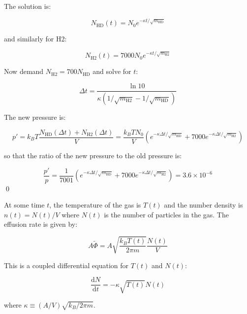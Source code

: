 \documentclass[12pt]{article}
\begin{document}
The solution is:

\begin{equation}
    N_{\text{HD}}(t) = N_{0} e^{-\kappa t/\sqrt{m_{\text{HD}}}}
\end{equation}

and similarly for H2:

\begin{equation}
    N_{\text{H2}}(t) = 7000N_{0} e^{-\kappa t/\sqrt{m_{\text{H2}}}}
\end{equation}

Now demand $N_{\text{H2}} = 700N_{\text{HD}}$ and solve for $t$:

\begin{equation}
    \Delta t = \frac{\ln{10}}{\kappa(1/\sqrt{m_{\text{H2}}} - 1/\sqrt{m_{\text{HD}}})}
\end{equation}

The new pressure is:

\begin{equation}
    p' = k_{B}T \frac{N_{\text{HD}}(\Delta t) + N_{\text{H2}}(\Delta t)}{V} = \frac{k_{B}TN_{0}}{V} \left( e^{-\kappa \Delta t/\sqrt{m_{\text{HD}}}} + 7000 e^{-\kappa \Delta t/\sqrt{m_{\text{H2}}}} \right)
\end{equation}

so that the ratio of the new pressure to the old pressure is:

\begin{equation}
    \frac{p'}{p} = \frac{1}{7001} \left( e^{-\kappa \Delta t/\sqrt{m_{\text{HD}}}} + 7000 e^{-\kappa \Delta t/\sqrt{m_{\text{H2}}}} \right) = 3.6 \times 10^{-6}
\end{equation}
\qed


At some time $t$, the temperature of the gas is $T(t)$ and the number density is $n(t) = N(t)/V$ where $N(t)$ is the number of particles in the gas. The effusion rate is given by:

\begin{equation}
    A\tilde{\Phi} = A \sqrt{\frac{k_{B}T(t)}{2\pi m}} \frac{N(t)}{V}
\end{equation}

This is a coupled differential equation for $T(t)$ and $N(t)$:

\begin{equation}
    \frac{\mathrm{d}N}{\mathrm{d}t} = -\kappa \sqrt{T(t)} N(t)
\end{equation}

where $\kappa \equiv (A/V) \sqrt{k_{B}/2\pi m}$.
\end{document}
